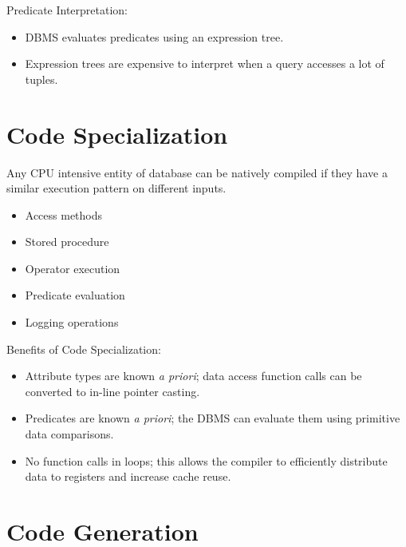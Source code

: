 \documentclass[11pt]{article}
\begin{document}
Predicate Interpretation:
\begin{itemize}
    \item
    DBMS evaluates predicates using an expression tree.
    
    \item
    Expression trees are expensive to interpret when a query accesses a lot of tuples.
\end{itemize}

\section{Code Specialization}
Any CPU intensive entity of database can be natively compiled if they have a similar 
execution pattern on different inputs.
\begin{itemize}
    \item Access methods
    \item Stored procedure
    \item Operator execution
    \item Predicate evaluation
    \item Logging operations
\end{itemize}
    
Benefits of Code Specialization:
\begin{itemize}
    \item
    Attribute types are known \textit{a priori}; data access function calls can be converted to 
    in-line pointer casting.
    
    \item
    Predicates are known \textit{a priori}; the DBMS can evaluate them using primitive 
    data comparisons.
    
    \item
    No function calls in loops; this allows the compiler to efficiently distribute data to 
    registers and increase cache reuse.
    
\end{itemize}

\section{Code Generation}
\end{document}
